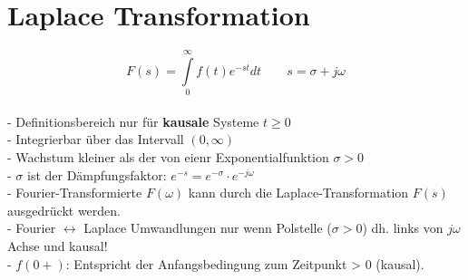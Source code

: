 \section{Laplace Transformation}
	$$\boxed{F(s)=\int\limits_0^\infty f(t)e^{-st}dt} \qquad s=\sigma +j\omega$$\\
	- Definitionsbereich nur für \textbf{kausale} Systeme $\boxed{t\geq 0}$\\
	- Integrierbar über das Intervall $(0,\infty)$\\
	- Wachstum kleiner als der von eienr Exponentialfunktion $\boxed{\sigma > 0}$\\
	- $\sigma$ ist der Dämpfungsfaktor: $e^{-s}=e^{-\sigma} \cdot e^{-j\omega}$ \\
	- Fourier-Transformierte $F(\omega)$ kann durch die
	Laplace-Transformation $F(s)$ ausgedrückt werden.  \\
	- Fourier $\longleftrightarrow$ Laplace Umwandlungen nur wenn Polstelle
	($\sigma > 0$) dh. links von $j\omega$ Achse und kausal!\\
	- $f(0+)$: Entspricht der Anfangsbedingung zum Zeitpunkt > 0 (kausal).
  
